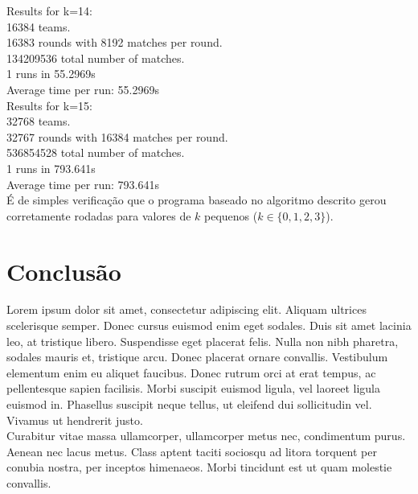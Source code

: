 \documentclass[twoside]{article}
\begin{document}
\begin{multicols}{2}
{\color[rgb]{0,0,1}Results for k=14:}\\
\hspace*{5mm}16384 teams.\\
\hspace*{5mm}16383 rounds with 8192 matches per round.\\
\hspace*{5mm}134209536 total number of matches.\\
\hspace*{5mm}1 runs in 55.2969s\\
\hspace*{5mm}Average time per run: {\color[rgb]{0.7,0.3,0}55.2969s}\\

{\color[rgb]{0,0,1}Results for k=15:}\\
\hspace*{5mm}32768 teams.\\
\hspace*{5mm}32767 rounds with 16384 matches per round.\\
\hspace*{5mm}536854528 total number of matches.\\
\hspace*{5mm}1 runs in 793.641s\\
\hspace*{5mm}Average time per run: {\color[rgb]{0.7,0.3,0}793.641s}\\

É de simples verificação que o programa baseado no algoritmo descrito gerou corretamente rodadas para valores de $k$ pequenos ($k \in \{0,1,2,3\}$).\\


\section{Conclusão}
\indent	Lorem ipsum dolor sit amet, consectetur adipiscing elit. Aliquam ultrices scelerisque semper. Donec cursus euismod enim eget sodales. Duis sit amet lacinia leo, at tristique libero. Suspendisse eget placerat felis. Nulla non nibh pharetra, sodales mauris et, tristique arcu. Donec placerat ornare convallis. Vestibulum elementum enim eu aliquet faucibus. Donec rutrum orci at erat tempus, ac pellentesque sapien facilisis. Morbi suscipit euismod ligula, vel laoreet ligula euismod in. Phasellus suscipit neque tellus, ut eleifend dui sollicitudin vel. Vivamus ut hendrerit justo. 
\\
\indent Curabitur vitae massa ullamcorper, ullamcorper metus nec, condimentum purus. Aenean nec lacus metus. Class aptent taciti sociosqu ad litora torquent per conubia nostra, per inceptos himenaeos. Morbi tincidunt est ut quam molestie convallis.



\end{multicols}
\end{document}
